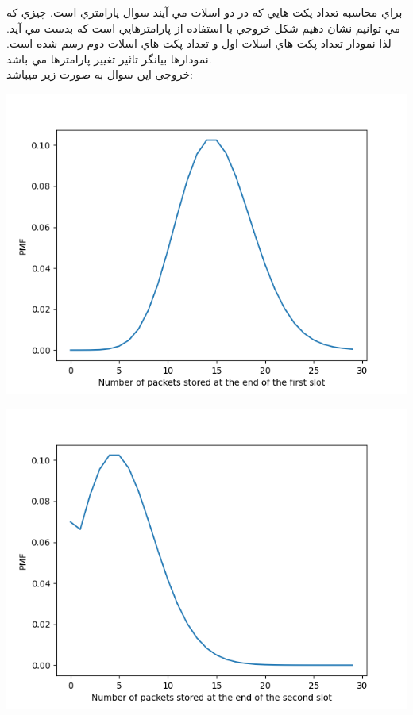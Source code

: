 \documentclass[a4paper,14pt]{article}
\begin{document}
براي محاسبه تعداد پكت هايي كه در دو اسلات مي آيند سوال پارامتري است. چيزي كه مي توانيم نشان دهيم شكل خروجي با
استفاده از پارامترهايي است كه بدست مي آيد.
لذا نمودار تعداد پكت هاي اسلات اول و تعداد پكت هاي اسلات دوم رسم شده است. نمودارها بيانگر تاثير تغيير پارامترها مي
باشد.\\

خروجی این سوال به صورت زیر میباشد:\\

\begin{center}
	\includegraphics[width=1\textwidth]{pic1.png}
\end{center}
\begin{center}
	\includegraphics[width=1\textwidth]{pic2.png}
\end{center}
\end{document}
